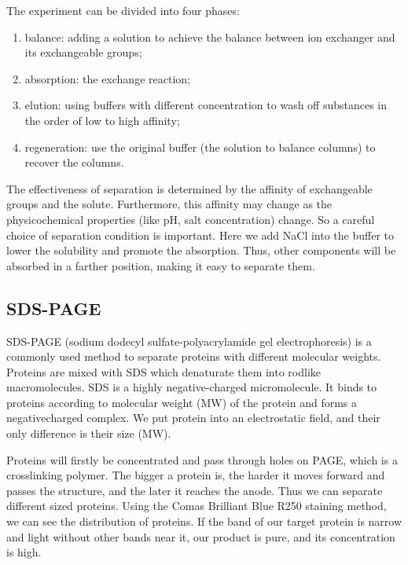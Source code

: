 The experiment can be divided into four phases:
\begin{enumerate}
\item balance: adding a solution to achieve the balance between ion exchanger and its exchangeable groups;
\item absorption: the exchange reaction;
\item elution: using buffers with different concentration to wash off substances in the order of low to high  affinity;
\item regeneration: use the original buffer (the solution to balance columns) to recover the columns.
\end{enumerate}

The effectiveness of separation is determined by the affinity of exchangeable groups and the solute. Furthermore, this affinity may change as the physicochemical properties (like pH,
salt concentration) change. So a careful choice of separation condition is important. Here
we add NaCl into the buffer to lower the solubility and promote the absorption. Thus, other
components will be absorbed in a farther position, making it easy to separate them.


\subsection{SDS-PAGE}

SDS-­PAGE (sodium dodecyl sulfate-polyacrylamide gel electrophoresis) is a commonly
used method to separate proteins with different molecular weights. Proteins are mixed with
SDS which denaturate them into rodlike macromolecules. SDS is a highly negative-­charged
micromolecule. It binds to proteins according to molecular weight (MW) of the protein and
forms a negative­charged complex. We put protein into an electrostatic field, and their only
difference is their size (MW).

Proteins will firstly be concentrated and pass through holes on PAGE, which is a crosslink­ing polymer. The bigger a protein is, the harder it moves forward and passes the structure, and
the later it reaches the anode. Thus we can separate different sized proteins. Using the Comas
Brilliant Blue R250 staining method, we can see the distribution of proteins. If the band of
our target protein is narrow and light without other bands near it, our product is pure, and its
concentration is high.

%

